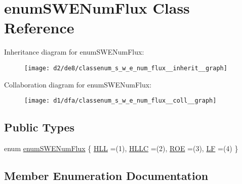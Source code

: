 \hypertarget{classenum_s_w_e_num_flux}{}\section{enum\+S\+W\+E\+Num\+Flux Class Reference}
\label{classenum_s_w_e_num_flux}


Inheritance diagram for enum\+S\+W\+E\+Num\+Flux\+:
\nopagebreak
\begin{figure}[H]
\begin{center}
\leavevmode
\texttt{[image: d2/de8/classenum\_s\_w\_e\_num\_flux\_\_inherit\_\_graph]}
\end{center}
\end{figure}


Collaboration diagram for enum\+S\+W\+E\+Num\+Flux\+:
\nopagebreak
\begin{figure}[H]
\begin{center}
\leavevmode
\texttt{[image: d1/dfa/classenum\_s\_w\_e\_num\_flux\_\_coll\_\_graph]}
\end{center}
\end{figure}
\subsection*{Public Types}
\begin{DoxyCompactItemize}
\item 
enum \hyperlink{classenum_s_w_e_num_flux_a2db6c5a3adf54013f06aa4e69d1053be}{enum\+S\+W\+E\+Num\+Flux} \{ \hyperlink{classenum_s_w_e_num_flux_a2db6c5a3adf54013f06aa4e69d1053bea1e813750bf738ec1aa0c2b4b2ad2212a}{H\+LL} =(1), 
\hyperlink{classenum_s_w_e_num_flux_a2db6c5a3adf54013f06aa4e69d1053bea181da0ce7c44b80018ba759ab1bf41c1}{H\+L\+LC} =(2), 
\hyperlink{classenum_s_w_e_num_flux_a2db6c5a3adf54013f06aa4e69d1053beae1fb467550fe8b5cfe320121a2442b8f}{R\+OE} =(3), 
\hyperlink{classenum_s_w_e_num_flux_a2db6c5a3adf54013f06aa4e69d1053bea447f5d392c494c26c089dc3ef55a310f}{LF} =(4)
 \}
\end{DoxyCompactItemize}


\subsection{Member Enumeration Documentation}
\mbox{\label{classenum_s_w_e_num_flux_a2db6c5a3adf54013f06aa4e69d1053be}} 
